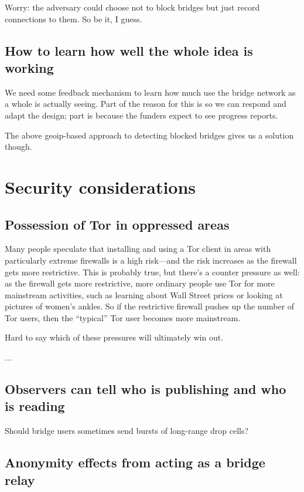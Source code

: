 \documentclass{llncs}
\begin{document}
Worry: the adversary could choose not to block bridges but just record
connections to them. So be it, I guess.

\subsection{How to learn how well the whole idea is working}

We need some feedback mechanism to learn how much use the bridge network
as a whole is actually seeing. Part of the reason for this is so we can
respond and adapt the design; part is because the funders expect to see
progress reports.

The above geoip-based approach to detecting blocked bridges gives us a
solution though.

\section{Security considerations}
\label{sec:security}

\subsection{Possession of Tor in oppressed areas}

Many people speculate that installing and using a Tor client in areas with
particularly extreme firewalls is a high risk---and the risk increases
as the firewall gets more restrictive. This is probably true, but there's
a counter pressure as well: as the firewall gets more restrictive, more
ordinary people use Tor for more mainstream activities, such as learning
about Wall Street prices or looking at pictures of women's ankles. So
if the restrictive firewall pushes up the number of Tor users, then the
``typical'' Tor user becomes more mainstream.

Hard to say which of these pressures will ultimately win out.

...

\subsection{Observers can tell who is publishing and who is reading}
\label{subsec:upload-padding}

Should bridge users sometimes send bursts of long-range drop cells?

\subsection{Anonymity effects from acting as a bridge relay}
\end{document}
